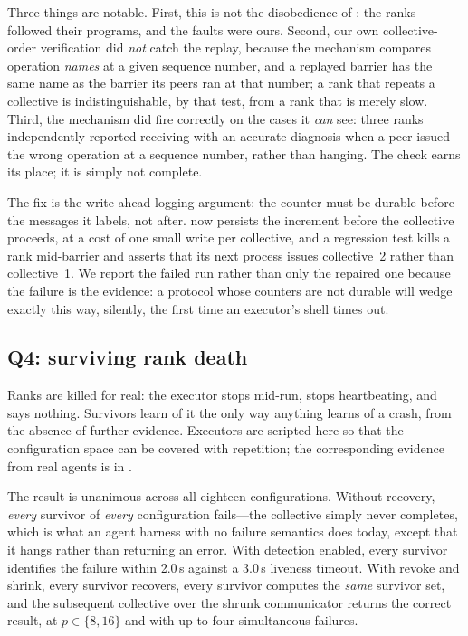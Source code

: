 Three things are notable. First, this is not the disobedience of
: the ranks followed their programs, and
the faults were ours. Second, our own collective-order verification did
\emph{not} catch the replay, because the mechanism compares operation
\emph{names} at a given sequence number, and a replayed barrier has the same
name as the barrier its peers ran at that number; a rank that repeats a
collective is indistinguishable, by that test, from a rank that is merely
slow. Third, the mechanism did fire correctly on the cases it \emph{can}
see: three ranks independently reported receiving 
with an accurate diagnosis when a peer issued the wrong operation at a
sequence number, rather than hanging. The check earns its place; it is
simply not complete.

The fix is the write-ahead logging argument: the counter must be durable
before the messages it labels, not after.  now persists the
increment before the collective proceeds, at a cost of one small write per
collective, and a regression test kills a rank mid-barrier and asserts that
its next process issues collective~2 rather than collective~1. We report the
failed run rather than only the repaired one because the failure is the
evidence: a protocol whose counters are not durable will wedge exactly this
way, silently, the first time an executor's shell times out.

\subsection{Q4: surviving rank death}
\label{sec:eval-faults}

Ranks are killed for real: the executor stops mid-run, stops heartbeating,
and says nothing. Survivors learn of it the only way anything learns of a
crash, from the absence of further evidence. Executors are scripted here so
that the configuration space can be covered with repetition; the
corresponding evidence from real agents is in
.



The result is unanimous across all eighteen configurations. Without
recovery, \emph{every} survivor of \emph{every} configuration fails---the
collective simply never completes, which is what an agent harness with no
failure semantics does today, except that it hangs rather than returning an
error. With detection enabled, every survivor identifies the failure within
2.0\,s against a 3.0\,s liveness timeout. With revoke and shrink, every
survivor recovers, every survivor computes the \emph{same} survivor set, and
the subsequent collective over the shrunk communicator returns the correct
result, at $p \in \{8,16\}$ and with up to four simultaneous failures.

